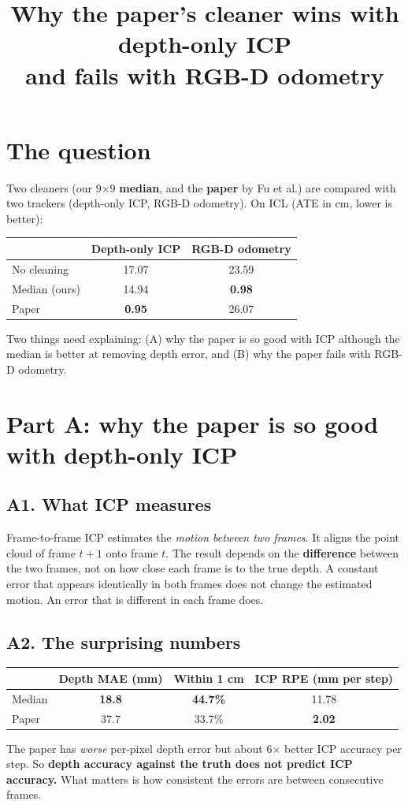 \documentclass[11pt,a4paper]{article}
\title{Why the paper's cleaner wins with depth-only ICP\\and fails with RGB-D odometry}
\date{}
\begin{document}
\maketitle

\section*{The question}
Two cleaners (our 9$\times$9 \textbf{median}, and the \textbf{paper} by Fu et al.) are compared with two trackers (depth-only ICP, RGB-D odometry). On ICL (ATE in cm, lower is better):

\begin{center}
\begin{tabular}{lcc}\toprule
 & Depth-only ICP & RGB-D odometry\\\midrule
No cleaning & 17.07 & 23.59\\
Median (ours) & 14.94 & \textbf{0.98}\\
Paper & \textbf{0.95} & 26.07\\\bottomrule
\end{tabular}
\end{center}
Two things need explaining: (A) why the paper is so good with ICP although the median is better at removing depth error, and (B) why the paper fails with RGB-D odometry.

\section*{Part A: why the paper is so good with depth-only ICP}

\subsection*{A1. What ICP measures}
Frame-to-frame ICP estimates the \emph{motion between two frames}. It aligns the point cloud of frame $t+1$ onto frame $t$. The result depends on the \textbf{difference} between the two frames, not on how close each frame is to the true depth. A constant error that appears identically in both frames does not change the estimated motion. An error that is different in each frame does.

\subsection*{A2. The surprising numbers}
\begin{center}
\begin{tabular}{lccc}\toprule
 & Depth MAE (mm) & Within 1 cm & ICP RPE (mm per step)\\\midrule
Median & \textbf{18.8} & \textbf{44.7\%} & 11.78\\
Paper & 37.7 & 33.7\% & \textbf{2.02}\\\bottomrule
\end{tabular}
\end{center}
The paper has \emph{worse} per-pixel depth error but about 6$\times$ better ICP accuracy per step. So \textbf{depth accuracy against the truth does not predict ICP accuracy.} What matters is how consistent the errors are between consecutive frames.
\end{document}
